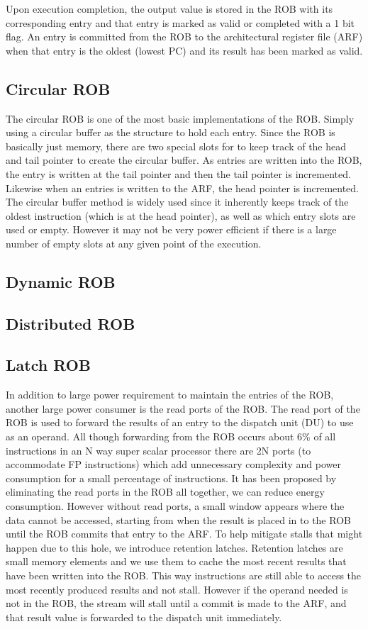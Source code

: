 \documentclass{acm_proc_article-sp}
\begin{document}
Upon execution completion, the output value is stored in the ROB with its 
corresponding entry and that entry is marked as valid or completed with a 
1 bit flag.  An entry is committed from the ROB to the architectural register
file (ARF) when that entry is the oldest (lowest PC) and its result has been 
marked as valid. 
\subsection{Circular ROB}
The circular ROB is one of the most basic implementations of the ROB.  Simply using
a circular buffer as the structure to hold each entry.  Since the ROB is basically
just memory, there are two special slots for to keep track of the head and tail
pointer to create the circular buffer.  As entries are written into the ROB, the
entry is written at the tail pointer and then the tail pointer is incremented.
Likewise when an entries is written to the ARF, the head pointer is incremented.
The circular buffer method is widely used since it inherently keeps track of the 
oldest instruction (which is at the head pointer), as well as which entry slots
are used or empty.   However it may not be very power efficient if there is a large
number of empty slots at any given point of the execution.    
\subsection{Dynamic ROB}

\subsection{Distributed ROB}

\subsection{Latch ROB}
In addition to large power requirement to maintain the entries of the ROB, another 
large power consumer is the read ports of the ROB.  The read port of the ROB is used
to forward the results of an entry to the dispatch unit (DU) to use as an operand.
All though forwarding from the ROB occurs about 6\%\cite{kucuk} of all instructions 
in an N way super scalar processor there are 2N ports (to accommodate FP
 instructions) which add unnecessary complexity and power consumption for a small 
percentage of instructions.  It has been proposed by eliminating the read ports 
in the ROB all together, we can reduce energy consumption\cite{kucuk}.  However
without read ports, a small window appears where the data cannot be accessed,
starting from when the result is placed in to the ROB until the ROB commits that 
entry to the ARF.  To help mitigate stalls that might happen due to this hole, 
we introduce retention latches.   Retention latches are small memory elements and 
we use them to cache the most recent results that have been written into the ROB.
This way instructions are still able to access the most recently produced results
and not stall.  However if the operand needed is not in the ROB, the stream will 
stall until a commit is made to the ARF, and that result value is forwarded to 
the dispatch unit immediately.
\end{document}
